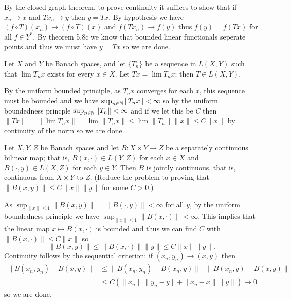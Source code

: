 \documentclass[12pt,a4paper]{article}
\begin{document}
\begin{solution}
   By the closed graph theorem, to prove continuity it suffices to show that if $x_n\to x$ and $Tx_n\to y$ then $y=Tx.$ 
   By hypothesis we have $(f\circ T)(x_n)\to(f\circ T)(x)$ and $f(Tx_n)\to f(y)$ thus $f(y)=f(Tx)$ for all $f\in Y^*.$ 
   By theorem 5.8c we know that bounded linear functionals seperate points and thus we must have $y=Tx$ so we are done. 
\end{solution}
\begin{problem}\label{prob:5-38}
Let $X$ and $Y$ be Banach spaces, and let $\{T_n\}$ be a sequence in $L(X,Y)$ such that $\lim T_n x$ exists for every $x \in X$. Let $Tx = \lim T_n x$; then $T \in L(X,Y)$.
\end{problem}
\begin{solution}
    By the uniform bounded principle, as $T_nx$ converges for each $x$, this sequence must be bounded and we have $\sup_{n\in\mathbb{N}}\|T_nx\|<\infty$ so by the uniform boundedness princple $\sup_{n\in\mathbb{N}}\|T_n\|<\infty$ and if we let this be $C$ then $\|Tx\|=\|\lim T_nx\|=\lim\|T_nx\|\leq\lim\|T_n\|\|x\|\leq C\|x\|$ by continuity of the norm so we are done. 
\end{solution}
\begin{problem}\label{prob:5-39}
Let $X, Y, Z$ be Banach spaces and let $B : X \times Y \rightarrow Z$ be a separately continuous bilinear map; that is, $B(x,\cdot) \in L(Y,Z)$ for each $x \in X$ and $B(\cdot,y) \in L(X,Z)$ for each $y \in Y$. Then $B$ is jointly continuous, that is, continuous from $X \times Y$ to $Z$. (Reduce the problem to proving that $\|B(x,y)\| \le C\|x\|\|y\|$ for some $C > 0$.)
\end{problem}
\begin{solution}
    As $\sup_{\|x\|\leq 1}\|B(x,y)\|=\|B(\cdot,y)\|<\infty$ for all $y$, by the uniform boundedness principle we have $\sup_{\|x\|\leq 1}\|B(x,\cdot)\|<\infty$. 
    This implies that the linear map $x\mapsto B(x,\cdot)$ is bounded and thus we can find $C$ with $\|B(x,\cdot)\|\leq C\|x\|$ so 
    \[
        \|B(x,y)\|\leq\|B(x,\cdot)\|\|y\|\leq C\|x\|\|y\|.
    \]
    Continuity follows by the sequential criterion: if $(x_n,y_n)\to(x,y)$ then 
    \[
        \begin{aligned}
        \|B(x_n,y_n)-B(x,y)\| &\leq \|B(x_n,y_n)-B(x_n,y)\|+\|B(x_n,y)-B(x,y)\| \\
                              &\leq C(\|x_n\|\|y_n-y\|+\|x_n-x\|\|y\|)\longrightarrow 0
        \end{aligned}
    \]
    so we are done. 
\end{solution}
\end{document}
